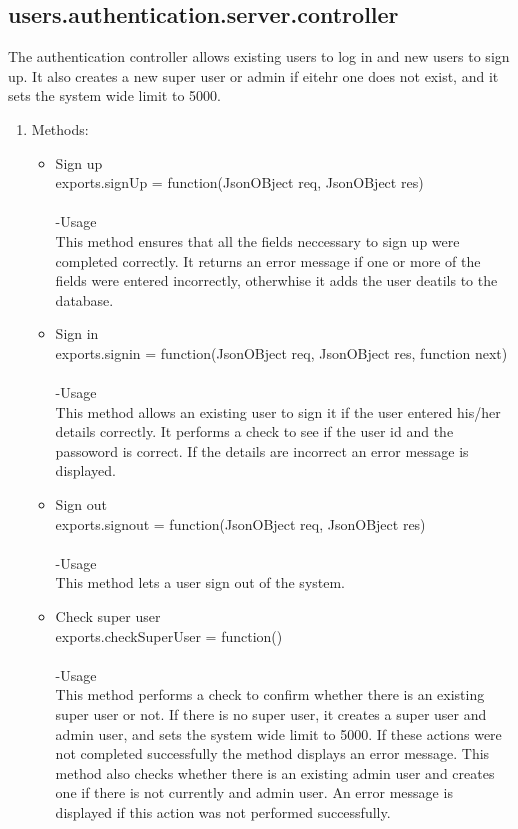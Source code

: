 \documentclass[a4paper,12pt]{report}
\begin{document}
\subsection{users.authentication.server.controller}
 The authentication controller allows existing users to log in and new users to sign up. It also creates a new super user or admin if eitehr one does not exist, and it sets the system wide limit to 5000.
\begin{enumerate}
\item Methods:
	\begin{itemize}
	\item Sign up\\ 
  	exports.signUp = function(JsonOBject req, JsonOBject res)\\ \\
  	-Usage\\
  	This method ensures that all the fields neccessary to sign up were completed correctly. It returns an error message if one or 	more of the fields were entered incorrectly, otherwhise it adds the user deatils to the database.
 	 \item Sign in\\
	exports.signin = function(JsonOBject req, JsonOBject res, function next) \\ \\
	-Usage\\
	This method allows an existing user to sign it if the user entered his/her details correctly. It performs a check to see if the user 	id and the passoword is correct. If the details are incorrect an error message is displayed.
	\item Sign out\\
	exports.signout = function(JsonOBject req, JsonOBject res)\\  \\
	-Usage\\
	This method lets a user sign out of the system.
 	 \item Check super user\\ exports.checkSuperUser = function()\\ \\
 	 -Usage\\ 
  This method performs a check to confirm whether there is an existing super user or not. If there is no super user, it creates a super user and admin user, and sets the system wide limit to 5000. If these actions were not completed successfully the method displays an error message. This method also checks whether there is an existing admin user and creates one if there is not currently and admin user. An error message is displayed if this action was not performed successfully.
	\end{itemize}
\end{enumerate} 
\end{document}
